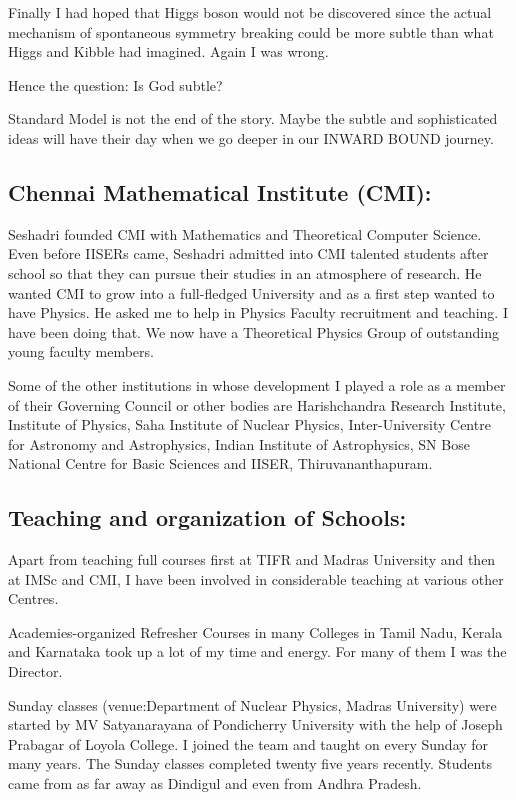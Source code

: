 Finally I had hoped that Higgs boson would not be discovered since the 
actual mechanism of spontaneous symmetry breaking could be more subtle 
than what Higgs and Kibble had imagined. Again I was wrong.
\smallskip

Hence the question: Is God subtle?
\smallskip

Standard Model is not the end of the story. Maybe the subtle and 
sophisticated ideas will have their day when we go deeper in our INWARD 
BOUND journey.

\subsection*{Chennai Mathematical Institute (CMI):}

Seshadri founded CMI with Mathematics and Theoretical Compu\-ter Science. 
Even before IISERs came, Seshadri admitted into CMI talented students 
after school so that they can pursue their studies in an atmosphere of 
research. He wanted CMI to grow into a full-fledged University and as a 
first step wanted to have Physics. He asked me to help in Physics 
Faculty recruitment and teaching. I have been doing that. We now have a 
Theoretical Physics Group of outstanding young faculty members.
\smallskip

Some of the other institutions in whose development I played a role as a 
member of their Governing Council or other bodies are Harishchandra 
Research Institute, Institute of Physics, Saha Insti\-tute of Nuclear 
Physics, Inter-University Centre for Astro\-nomy and Astrophysics, Indian 
Institute of Astrophysics, SN Bose National Centre for Basic Sciences 
and IISER, Thiruvanantha\-puram.

\subsection*{Teaching and organization of Schools:}

Apart from teaching full courses first at TIFR and Madras
Univer\-sity and then at IMSc and CMI, I have been involved in
conside\-rable teaching at various other Centres.


Academies-organized Refresher Courses in many Colleges in
Tamil Nadu, Kerala and Karnataka took up a lot of my time and
energy. For many of them I was the Director.


Sunday classes (venue:Department of Nuclear Physics, Madras University) 
were started by MV Satyanarayana of Pondicherry University with the 
help of Joseph Prabagar of Loyola College. I joined the team and taught 
on every Sunday for many years. The Sunday classes completed twenty 
five years recently. Students came from as far away as Dindigul and 
even from Andhra Pradesh.



